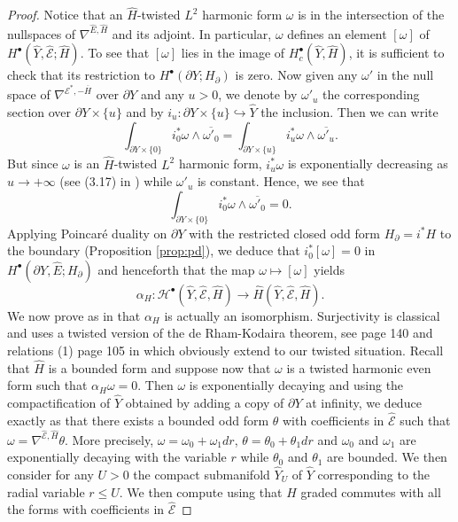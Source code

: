 \documentclass[12pt]{amsart}
\theoremstyle{plain}
\theoremstyle{definition}
\theoremstyle{remark}
\begin{document}
\begin{proof}
Notice that an ${\hat H}$-twisted  $L^2$ harmonic form $\omega$ is in the intersection of the nullspaces of $\nabla^{\hat E, {\hat H}}$ and its adjoint. 
In particular,  $\omega$ defines an element $[\omega]$ of $H^\bullet(\hat Y, \hat {\mathcal E}; {\hat H})$. To see that $[\omega]$ lies in the image of
$H^\bullet_c(\hat Y, {\hat H})$, it is sufficient to check that its restriction to $H^\bullet(\partial Y; H_\partial)$ is zero. Now given any $\omega'$ in the null space 
of $\nabla^{{\mathcal E}^*, -{\overline H}}$ over $\partial Y$ and any $u>0$, we denote by $\omega'_u$ the corresponding section over $\partial Y \times \{u\}$ and by $i_u: \partial Y\times \{u\}\hookrightarrow {\hat Y}$ the inclusion. Then we can write 
$$
\int_{\partial Y \times \{0\}} i_0^*\omega \wedge {\overline{\omega'_0}} = \int_{\partial Y \times \{u\}} i_u^*\omega \wedge {\overline{\omega'_u}}.
$$
But since $\omega$ is an ${\hat H}$-twisted  $L^2$ harmonic form, $i_u^*\omega$ is exponentially decreasing as $u\to +\infty$ (see (3.17) in \cite{APS1}) while $\omega'_u$ is constant. Hence, we see that
$$
\int_{\partial Y \times \{0\}} i_0^*\omega \wedge {\overline{\omega'_0}} = 0.
$$ 
Applying Poincar\'e duality on $\partial Y$ with the restricted closed odd form ${{H_\partial=}}i^*H$ to the boundary (Proposition \ref{prop:pd}), we deduce that 
$i_0^*[\omega] = 0$ in $H^\bullet (\partial Y, \hat E; H_\partial)$ and henceforth that the map $\omega \mapsto [\omega]$ yields
$$
\alpha_H: {\mathcal H}^\bullet (\hat Y, \hat {\mathcal E}, \hat H) \rightarrow {\hat H} (\hat Y, \hat {\mathcal E}, \hat H).
$$
We now prove as in \cite{APS1} that $\alpha_H$ is actually an isomorphism. Surjectivity is classical and uses a twisted version of the de Rham-Kodaira theorem, see page 140 and
 relations (1) page 105 in \cite{deRham} which obviously extend to our twisted situation. Recall that ${\hat H}$ is a bounded form 
and suppose now that $\omega$ is a twisted harmonic even form such that $\alpha_H \omega =0$. Then $\omega$ is exponentially decaying and using the compactification of $\hat Y$ obtained by adding a copy of $\partial Y$ at infinity, we deduce exactly as \cite{APS1} that there exists a bounded odd form $\theta$ with coefficients in $\hat {\mathcal E}$ such that $\omega=\nabla^{\hat{\mathcal E}, {\hat H}} \theta$. More precisely, $\omega= \omega_0+\omega_1 dr$, $\theta=\theta_0+\theta_1 dr$ and $\omega_0$ and $\omega_1$ are exponentially decaying with the variable $r$ while $\theta_0$ and $\theta_1$ are bounded. We then consider for any $U>0$ the compact submanifold ${\hat Y}_U$ of $\hat Y$ corresponding to the radial variable $r\leq U$. We then compute using that $H$  graded commutes with all the forms with coefficients in $\hat {\mathcal E}$

\end{proof}
\end{document}
